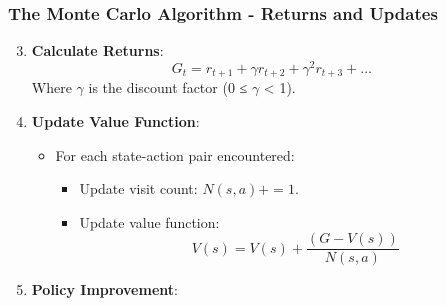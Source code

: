 \documentclass[aspectratio=169]{beamer}
\begin{document}
\begin{frame}[fragile]
    \frametitle{The Monte Carlo Algorithm - Returns and Updates}
    \begin{enumerate}
        \setcounter{enumi}{2} %
        \item \textbf{Calculate Returns}:
        \begin{equation}
            G_t = r_{t+1} + \gamma r_{t+2} + \gamma^2 r_{t+3} + \ldots
        \end{equation}
        Where $\gamma$ is the discount factor (0 ≤ $\gamma$ < 1).

        \item \textbf{Update Value Function}:
        \begin{itemize}
            \item For each state-action pair encountered:
            \begin{itemize}
                \item Update visit count: $N(s, a) += 1$.
                \item Update value function: 
                \[
                V(s) = V(s) + \frac{(G - V(s))}{N(s, a)}
                \]
            \end{itemize}
        \end{itemize}

        \item \textbf{Policy Improvement}:
        \end{enumerate}
\end{frame}
\end{document}
